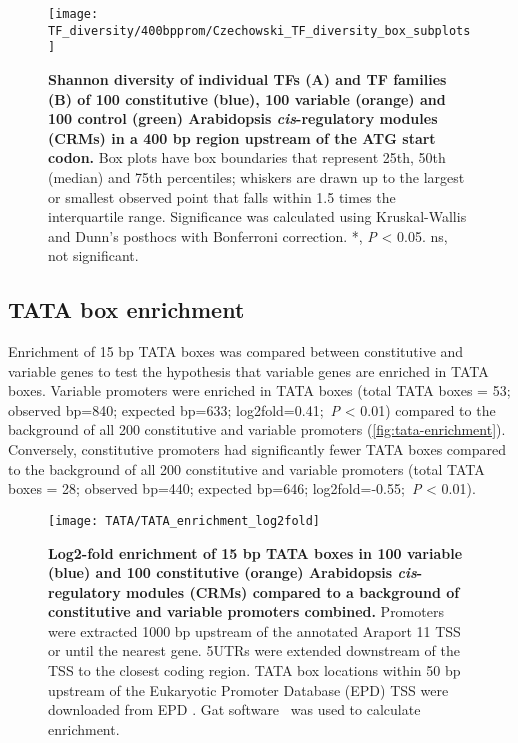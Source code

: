 \documentclass[../main.tex]{subfiles}
\begin{document}
\begin{figure}[hbt!]
	\begin{center}
		\capstart
		\texttt{[image: TF\_diversity/400bpprom/Czechowski\_TF\_diversity\_box\_subplots]}
		\caption{
			\textbf{Shannon diversity of individual TFs (A) and TF families (B) of 100 constitutive (blue), 100 variable (orange) and 100 control (green) Arabidopsis \textit{cis}\hyp{}regulatory modules (CRMs) in a 400 bp region upstream of the ATG start codon.}
			Box plots have box boundaries that represent 25th, 50th (median) and 75th percentiles; whiskers are drawn up to the largest or smallest observed point that falls within 1.5 times the interquartile range.
			\label{fig:tf-diversity-400bpprom}
			Significance was calculated using Kruskal\hyp{}Wallis and Dunn's posthocs with Bonferroni correction.
			*, \textit{P} \textless{} 0.05. ns, not significant.
		}
	\end{center}
\end{figure}



\subsection{TATA box enrichment}

Enrichment of 15 bp TATA boxes was compared between constitutive and
variable genes to test the hypothesis that variable genes are enriched in TATA boxes.
Variable promoters were enriched in TATA boxes (total TATA boxes = 53; observed bp=840; expected bp=633; log2fold=0.41;~\textit{P} \textless{} 0.01) compared to the background of all 200 constitutive and variable promoters
(\autoref{fig:tata-enrichment}).
Conversely, constitutive promoters had significantly fewer TATA boxes compared to the background of all 200 constitutive and variable promoters (total TATA boxes = 28; observed bp=440; expected bp=646; log2fold=-0.55;~\textit{P} \textless{} 0.01).

\begin{figure}[!h]
	\begin{center}
		\capstart
		\texttt{[image: TATA/TATA\_enrichment\_log2fold]}
		\caption{
			\textbf{Log2\hyp{}fold enrichment of 15 bp TATA boxes in 100 variable (blue) and 100 constitutive (orange) Arabidopsis \textit{cis}\hyp{}regulatory modules (CRMs) compared to a background of constitutive and variable promoters combined.}
			Promoters were extracted 1000 bp upstream of the annotated Araport 11 \autocite{chengAraport11CompleteReannotation2017} TSS or until the nearest gene.
			5UTRs were extended downstream of the TSS to the closest coding region.
			TATA box locations within 50 bp upstream of the Eukaryotic Promoter Database (EPD) TSS were downloaded from EPD \autocite{dreosInfluenceRotationalNucleosome2016}.
			 Gat software~\autocite{hegerGATSimulationFramework2013} was used to calculate enrichment.
			\label{fig:tata-enrichment}
		}
	\end{center}
\end{figure}
\end{document}
